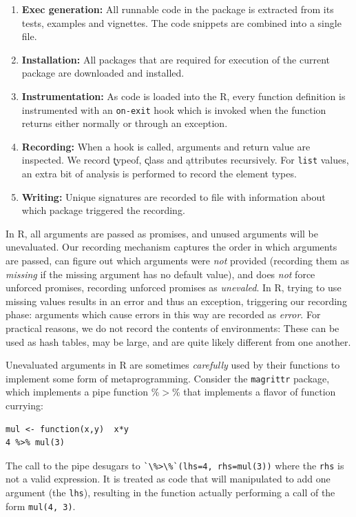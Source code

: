 \documentclass[acmsmall,10pt,review,anonymous]{acmart}\settopmatter{printfolios=true,printccs=false,printacmref=false}
\newcommand{\code}[1]{\lstinline|#1|\xspace}
\begin{document}
\begin{enumerate}
\item {\bf Exec generation:} All runnable code in the package is extracted
  from its tests, examples and vignettes. The code snippets are combined
  into a single file.
\item {\bf Installation:} All packages that are required for execution of
  the current package are downloaded and installed.
\item {\bf Instrumentation:} As code is loaded into the R, every function
  definition is instrumented with an \code{on-exit} hook which is invoked
  when the function returns either normally or through an exception.
\item {\bf Recording:} When a hook is called, arguments and return value are
  inspected. We record \k{typeof}, \k{class} and \k{attributes} recursively.
  For \code{list} values, an extra bit of analysis is performed to record
  the element types.
\item {\bf Writing:} Unique signatures are recorded to file with information
  about which package triggered the recording.
\end{enumerate}

In R, all arguments are passed as promises, and unused arguments will be unevaluated. 
Our recording mechanism captures the order in which arguments are passed, can figure out which arguments were {\it not} provided (recording them as {\it missing} if the missing argument has no default value), and does {\it not} force unforced promises, recording unforced promises as {\it unevaled}.
In R, trying to use missing values results in an error and thus an exception, triggering our recording phase: arguments which cause errors in this way are recorded as {\it error}.
For practical reasons, we do not record the contents of environments:
These can be used as hash tables, may be large, and are quite likely different from one another.

Unevaluated arguments in R are sometimes {\it carefully} used by their functions to implement some form of metaprogramming.
Consider the {\tt magrittr} package, which implements a pipe function \%$>$\% that implements a flavor of function currying:

{\small\begin{lstlisting}[style=R]
mul <- function(x,y)  x*y
4 %>% mul(3)
\end{lstlisting}}

The call to the pipe desugars to \code{`\%>\%`(lhs=4, rhs=mul(3))} where the
\code{rhs} is not a valid expression. It is treated as code that will
manipulated to add one argument (the \code{lhs}), resulting in the function
actually performing a call of the form \code{mul(4, 3)}.
\end{document}

